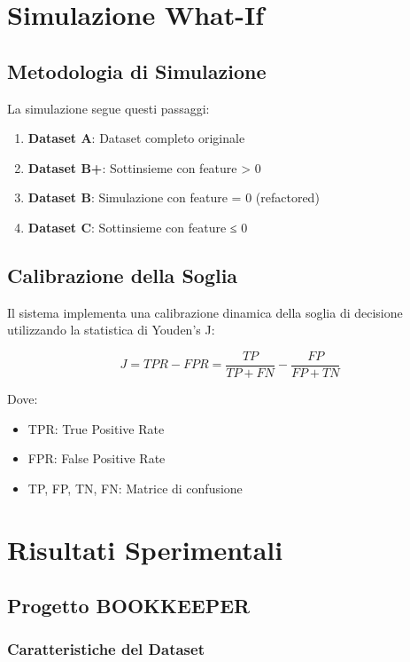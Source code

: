 \documentclass[12pt,a4paper]{article}
\begin{document}
\section{Simulazione What-If}

\subsection{Metodologia di Simulazione}

La simulazione segue questi passaggi:

\begin{enumerate}
    \item \textbf{Dataset A}: Dataset completo originale
    \item \textbf{Dataset B+}: Sottinsieme con feature > 0
    \item \textbf{Dataset B}: Simulazione con feature = 0 (refactored)
    \item \textbf{Dataset C}: Sottinsieme con feature ≤ 0
\end{enumerate}

\subsection{Calibrazione della Soglia}

Il sistema implementa una calibrazione dinamica della soglia di decisione utilizzando la statistica di Youden's J:

\begin{equation}
J = TPR - FPR = \frac{TP}{TP + FN} - \frac{FP}{FP + TN}
\end{equation}

Dove:
\begin{itemize}
    \item TPR: True Positive Rate
    \item FPR: False Positive Rate
    \item TP, FP, TN, FN: Matrice di confusione
\end{itemize}

\section{Risultati Sperimentali}

\subsection{Progetto BOOKKEEPER}

\subsubsection{Caratteristiche del Dataset}
\end{document}
